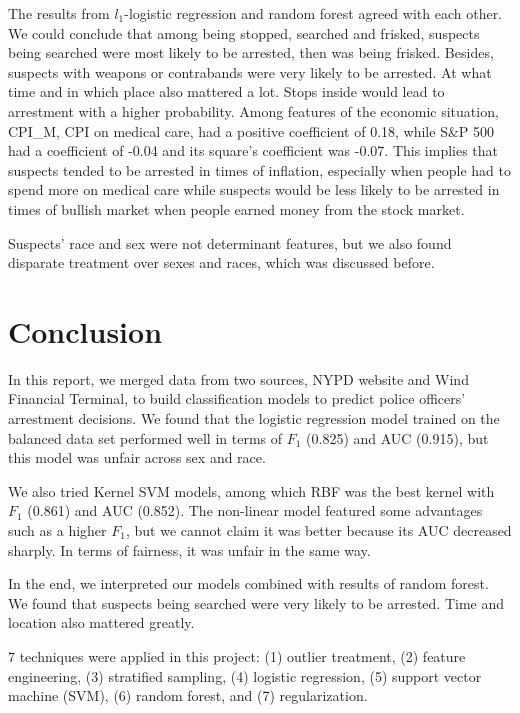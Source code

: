 The results from $l_1$-logistic regression and random forest agreed with each other. We could conclude that among being stopped, searched and frisked, suspects being searched were most likely to be arrested, then was being frisked. Besides, suspects with weapons or contrabands were very likely to be arrested. At what time and in which place also mattered a lot. Stops inside would lead to arrestment with a higher probability. Among features of the economic situation, CPI\_M, CPI on medical care, had a positive coefficient of 0.18, while S\&P 500 had a coefficient of -0.04 and its square's coefficient was -0.07. This implies that suspects tended to be arrested in times of inflation, especially when people had to spend more on medical care while suspects would be less likely to be arrested in times of bullish market when people earned money from the stock market. 

Suspects' race and sex were not determinant features, but we also found disparate treatment over sexes and races, which was discussed before.


\section{Conclusion} \label{sec:conclude}

In this report, we merged data from two sources, NYPD website and Wind Financial Terminal, to build classification models to predict police officers' arrestment decisions. We found that the logistic regression model trained on the balanced data set performed well in terms of $F_1$ (0.825) and AUC (0.915), but this model was unfair across sex and race. 

We also tried Kernel SVM models, among which RBF was the best kernel with $F_1$ (0.861) and AUC (0.852). The non-linear model featured some advantages such as a higher $F_1$, but we cannot claim it was better because its AUC decreased sharply. In terms of fairness, it was unfair in the same way.

In the end, we interpreted our models combined with results of random forest. We found that suspects being searched were very likely to be arrested. %
Time and location also mattered greatly. %

7 techniques were applied in this project: (1) outlier treatment, (2) feature engineering, (3) stratified sampling, (4) logistic regression, (5) support vector machine (SVM), (6) random forest, and (7) regularization.

